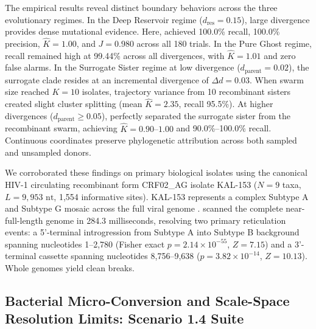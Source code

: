 The empirical results reveal distinct boundary behaviors across the three evolutionary regimes.
In the Deep Reservoir regime ($d_{\text{res}} = 0.15$), large divergence provides dense mutational evidence.
Here, \RhizAeon achieved 100.0\% recall, 100.0\% precision, $\hat{K} = 1.00$, and $J = 0.980$ across all 180 trials.
In the Pure Ghost regime, recall remained high at 99.44\% across all divergences, with $\hat{K} = 1.01$ and zero false alarms.
In the Surrogate Sister regime at low divergence ($d_{\text{parent}} = 0.02$), the surrogate clade resides at an incremental divergence of $\Delta d = 0.03$.
When swarm size reached $K = 10$ isolates, trajectory variance from 10 recombinant sisters created slight cluster splitting (mean $\hat{K} = 2.35$, recall 95.5\%).
At higher divergences ($d_{\text{parent}} \ge 0.05$), \RhizAeon perfectly separated the surrogate sister from the recombinant swarm, achieving $\hat{K} = 0.90\text{--}1.00$ and 90.0\%--100.0\% recall.
Continuous coordinates preserve phylogenetic attribution across both sampled and unsampled donors.

We corroborated these findings on primary biological isolates using the canonical HIV-1 circulating recombinant form CRF02\_AG isolate KAL-153 ($N=9$ taxa, $L = 9,953\text{ nt}$, 1,554 informative sites).
KAL-153 represents a complex Subtype A and Subtype G mosaic across the full viral genome \cite{carr1998full}.
\RhizAeon scanned the complete near-full-length genome in 284.3 milliseconds, resolving two primary reticulation events: a 5'-terminal introgression from Subtype A into Subtype B background spanning nucleotides 1--2,780 (Fisher exact $p = 2.14 \times 10^{-55}$, $Z = 7.15$) and a 3'-terminal cassette spanning nucleotides 8,756--9,638 ($p = 3.82 \times 10^{-14}$, $Z = 10.13$).
Whole genomes yield clean breaks.

\subsection{Bacterial Micro-Conversion and Scale-Space Resolution Limits: Scenario 1.4 Suite}
\label{subsec:micro_conversion}

